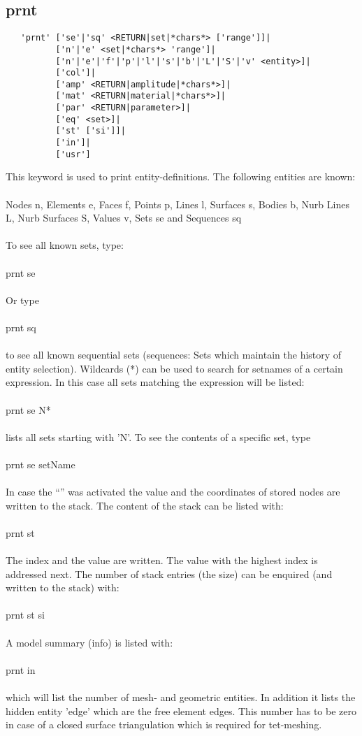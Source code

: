 \documentclass{article}
\begin{document}
\subsection{\label{prnt}prnt}
\begin{verbatim}
   'prnt' ['se'|'sq' <RETURN|set|*chars*> ['range']]|
          ['n'|'e' <set|*chars*> 'range']| 
          ['n'|'e'|'f'|'p'|'l'|'s'|'b'|'L'|'S'|'v' <entity>]| 
          ['col']|
          ['amp' <RETURN|amplitude|*chars*>]|
          ['mat' <RETURN|material|*chars*>]|
          ['par' <RETURN|parameter>]|
          ['eq' <set>]|
          ['st' ['si']]|
          ['in']|
          ['usr']
\end{verbatim}
This keyword is used to print entity-definitions. The following entities are known:\\\\
Nodes n, Elements e, Faces f, Points p, Lines l, Surfaces s, Bodies b, Nurb
Lines L, Nurb Surfaces S, Values v, Sets se and Sequences sq\\\\To see all
known sets, type:\\\\prnt se\\\\Or type\\\\prnt sq\\\\to see all known
sequential sets (sequences: Sets which maintain the history of entity selection). Wildcards (*) can be used to search for setnames
of a certain expression. In this case all sets matching the expression will be
listed:\\\\prnt se N*\\\\lists all sets starting with 'N'. To see the contents
of a specific set, type\\\\prnt se setName\\\\In case the
``'' was activated the value and the coordinates of
stored nodes are written to the stack. The content of the stack can be listed
with:\\\\prnt st\\\\The index and the value are written. The value with the
highest index is addressed next. The number of stack entries (the size) can be enquired (and written to the stack) with:\\\\prnt st si\\\\A model summary (info) is listed with:\\\\prnt in\\\\which will list the number of mesh- and geometric entities. In addition it lists the hidden entity 'edge' which are the free element edges. This number has to be zero in case of a closed surface triangulation which is required for tet-meshing.
\end{document}
